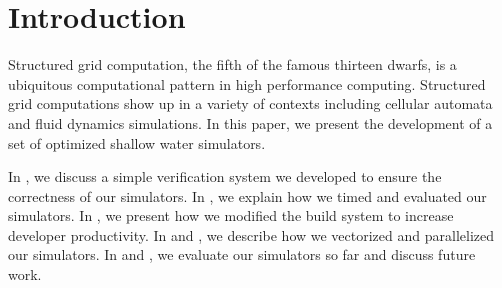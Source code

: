 \section{Introduction}\label{sec:intro}
Structured grid computation, the fifth of the famous thirteen dwarfs, is a
ubiquitous computational pattern in high performance computing. Structured grid
computations show up in a variety of contexts including cellular automata and
fluid dynamics simulations. In this paper, we present the development of a set
of optimized shallow water simulators.

In , we discuss a simple verification system we developed
to ensure the correctness of our simulators. In , we explain
how we timed and evaluated our simulators. In , we present how
we modified the build system to increase developer productivity. In
 and , we describe how we
vectorized and parallelized our simulators. In  and
, we evaluate our simulators so far and discuss future work.
